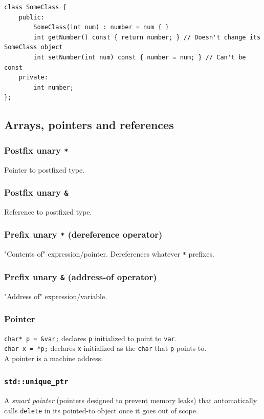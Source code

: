 \documentclass[table, xcdraw]{article}%
\begin{document}
\begin{verbatim}
class SomeClass {
    public:
        SomeClass(int num) : number = num { }
        int getNumber() const { return number; } // Doesn't change its SomeClass object
        int setNumber(int num) const { number = num; } // Can't be const
    private:
        int number;
};
\end{verbatim}

\subsection{Arrays, pointers and references}

\subsubsection{Postfix unary \texttt{*}}
Pointer to postfixed type.

\subsubsection{Postfix unary \texttt{&}}
Reference to postfixed type.

\subsubsection{Prefix unary \texttt{*} (dereference operator)}
"Contents of" expression/pointer. Dereferences whatever \texttt{*} prefixes.

\subsubsection{Prefix unary \texttt{&} (address-of operator)}
"Address of" expression/variable.

\subsubsection{Pointer}
\texttt{char* p = &var;} declares \texttt{p} initialized to point to \texttt{var}.\\
\texttt{char x = *p;} declares \texttt{x} initialized as the \texttt{char} that \texttt{p} points to.\\
A pointer is a machine address.

\subsubsection{\texttt{std::unique_ptr}} \label{unique_ptr}
A \emph{smart pointer} (pointers designed to prevent memory leaks) that automatically calls \texttt{delete} in its pointed-to object once it goes out of scope.
\end{document}
